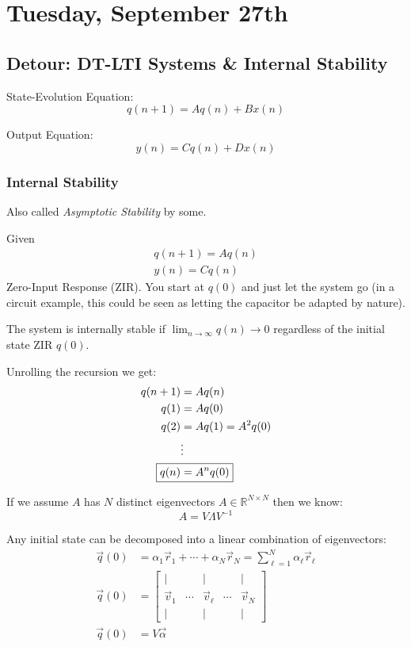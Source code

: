 \section{Tuesday, September 27th}
\subsection{Detour: DT-LTI Systems \& Internal Stability}
State-Evolution Equation:
\[
    q(n+1) = A q(n) + B x(n)
\]

Output Equation:
\[
    y(n) = C q(n) + D x(n)
\]

\subsubsection{Internal Stability}
Also called \textit{Asymptotic Stability} by some.

Given
\begin{align*}
    q(n+1) = A q(n)
    \\
    y(n)=Cq(n)
\end{align*}
Zero-Input Response (ZIR). You start at $q(0)$ and just let the system go (in a circuit example, this could be seen as letting the capacitor be adapted by nature).

\begin{shaded}
The system is internally stable if $\displaystyle\lim_{n\to\infty}q(n)\to0$ regardless of the initial state ZIR $q(0)$.
\end{shaded}

Unrolling the recursion we get:
\begin{align*}
    q(n+1) &= A q(n)
    \\
    q(1) &= A q(0)
    \\
    q(2) &= A q(1) = A^2 q(0)
    \\
    &\vdots
    \\
    \Aboxed{q(n) &= A^n q(0)}
\end{align*}

If we assume $A$ has $N$ distinct eigenvectors $A\in\mathbb R^{N\times N}$ then we know:
\[
    A = V\Lambda V^{-1}
\]

Any initial state can be decomposed into a linear combination of eigenvectors:
\begin{align*}
    \vec q(0) 
    &= \alpha_1 \vec r_1 + \cdots + \alpha_N \vec r_N = \sum_{\ell=1}^N \alpha_\ell \vec r_\ell
    \\
    \vec q(0) 
    &= \begin{bmatrix}
        | & & | & & | \\
        \vec v_1 & \cdots & \vec v_\ell & \cdots & \vec v_N \\
        | & & | & & |
    \end{bmatrix}
    \\
    \vec q(0) 
    &= V\vec \alpha
\end{align*}

